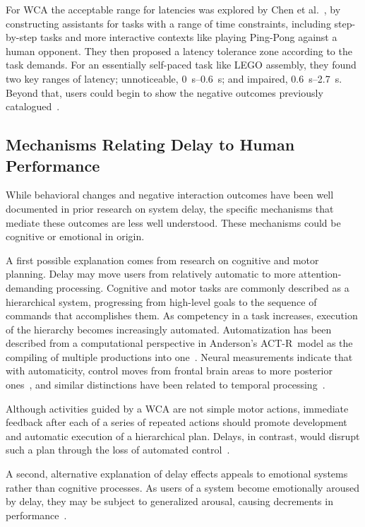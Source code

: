 \documentclass[10pt,letterpaper]{article}
\begin{document}
For WCA the acceptable range for latencies was explored by Chen et al.~\cite{Chen:AnEmpiricalStudyOfLatency}, by constructing assistants for tasks with a range of time constraints, including step-by-step tasks and more interactive contexts like playing Ping-Pong against a human opponent.
They then proposed a latency tolerance zone according to the task demands.
For an essentially self-paced task like LEGO assembly, they found two key ranges of latency; unnoticeable, \SIrange{0}{0.6}{\second}; and impaired, \SIrange{0.6}{2.7}{\second}. 
Beyond that, users could begin to show the negative outcomes previously catalogued~\cite{dabrowsky:2011:40years}.


\subsection{Mechanisms Relating Delay to Human Performance}\label{ssec:potentialmechs}

While behavioral changes and negative interaction outcomes have been well documented in prior research on system delay, the specific mechanisms that mediate these outcomes are less well understood. 
These mechanisms could be cognitive or emotional in origin.

A first possible explanation comes from research on cognitive and motor planning. 
Delay may move users from relatively automatic to more attention-demanding processing.
Cognitive and motor tasks are commonly described as a hierarchical system, progressing from high-level goals to the sequence of commands that accomplishes them.
As competency in a task increases, execution of the hierarchy becomes increasingly automated.
Automatization has been described from a computational perspective in {Anderson's ACT-R}~model as the compiling of multiple productions into one~\cite{neves1981knowledge}.
Neural measurements indicate that with automaticity, control moves from frontal brain areas to more posterior ones~\cite{jeon2015degree,puttemans2005changes}, and similar distinctions have been related to temporal processing~\cite{lewis2003distinct,koch2009neural,lee2019limiting}.

Although activities guided by a WCA are not simple motor actions, immediate feedback after each of a series of repeated actions should promote development and automatic execution of a hierarchical plan.
Delays, in contrast, would disrupt such a plan through the loss of automated control~\cite{lee2019limiting}.

A second, alternative explanation of delay effects appeals to emotional systems rather than cognitive processes.
As users of a system become emotionally aroused by delay, they may be subject to generalized arousal, causing decrements in performance~\cite{lee2019limiting}.
\end{document}
